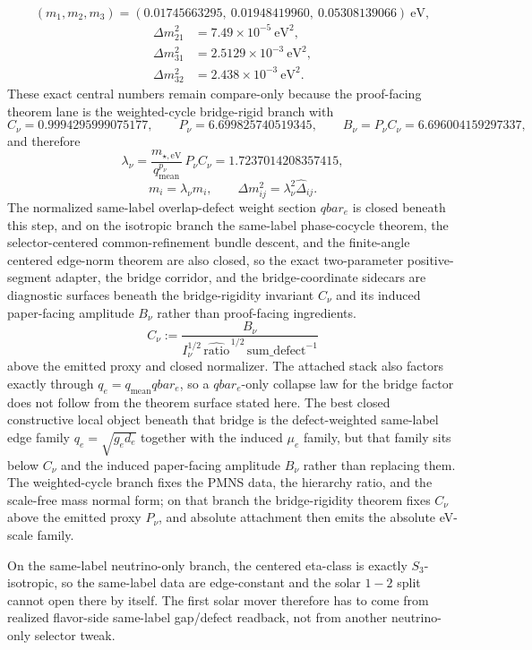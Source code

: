 \documentclass[11pt]{article}
\begin{document}
\[
(m_1,m_2,m_3)=(0.01745663295,\ 0.01948419960,\ 0.05308139066)\ \mathrm{eV},
\]
\[
\begin{aligned}
\Delta m_{21}^2&=7.49\times10^{-5}\ \mathrm{eV}^2,\\
\Delta m_{31}^2&=2.5129\times10^{-3}\ \mathrm{eV}^2,\\
\Delta m_{32}^2&=2.438\times10^{-3}\ \mathrm{eV}^2.
\end{aligned}
\]
These exact central numbers remain compare-only because the proof-facing theorem lane is the weighted-cycle bridge-rigid branch with
\[
C_\nu=0.9994295999075177,\qquad
P_\nu=6.699825740519345,\qquad
B_\nu=P_\nu C_\nu=6.696004159297337,
\]
and therefore
\[
\lambda_\nu=\frac{m_{\star,\mathrm{eV}}}{q_{\mathrm{mean}}^{p_\nu}}\,P_\nu C_\nu=1.7237014208357415,
\]
\[
m_i=\lambda_\nu \widehat m_i,
\qquad
\Delta m_{ij}^2=\lambda_\nu^2 \widehat{\Delta}_{ij}.
\]
The normalized same-label overlap-defect weight section \(qbar_e\) is closed beneath
this step, and on the isotropic branch the same-label phase-cocycle theorem, the
selector-centered common-refinement bundle descent, and the finite-angle centered edge-norm
theorem are also closed, so the exact two-parameter positive-segment adapter, the bridge corridor, and the bridge-coordinate sidecars are diagnostic surfaces beneath the bridge-rigidity invariant \(C_\nu\) and its induced paper-facing amplitude \(B_\nu\) rather than proof-facing ingredients.
\[
C_\nu:=\frac{B_\nu}{I_\nu^{1/2}\,\widehat{\mathrm{ratio}}^{\,1/2}\,\mathrm{sum\_defect}^{-1}}
\]
above the emitted proxy and closed normalizer. The attached stack also factors exactly through
\(q_e = q_{\mathrm{mean}} qbar_e\), so a \(qbar_e\)-only collapse law for the bridge factor does
not follow from the theorem surface stated here. The best closed constructive local object beneath that bridge is the
defect-weighted same-label edge family \(q_e=\sqrt{g_e d_e}\) together with the induced
\(\mu_e\) family, but that family sits below \(C_\nu\) and the induced paper-facing amplitude \(B_\nu\) rather than replacing them.
The weighted-cycle branch fixes the PMNS data, the hierarchy ratio, and the
scale-free mass normal form; on that branch the bridge-rigidity theorem fixes
\(C_\nu\) above the emitted proxy \(P_\nu\), and absolute attachment then emits the
absolute eV-scale family.

On the same-label neutrino-only branch, the centered eta-class is exactly \(S_3\)-isotropic, so
the same-label data are edge-constant and the solar \(1\!-\!2\) split cannot open there by itself.
The first solar mover therefore has to come from realized flavor-side same-label gap/defect
readback, not from another neutrino-only selector tweak.
\end{document}

